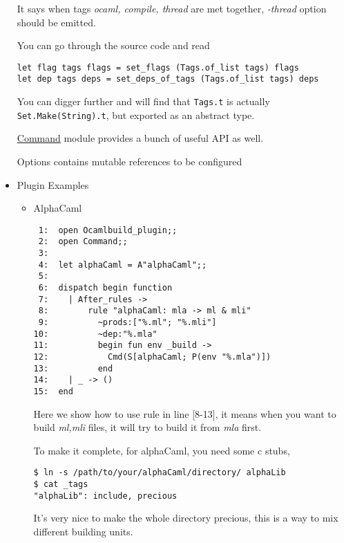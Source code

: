 \documentclass[11pt]{article}
\begin{document}
\begin{itemize}
     It says when tags \emph{ocaml, compile, thread} are met together,
     \emph{-thread} option should be emitted.

     You can go through the source code and read



\begin{verbatim}
let flag tags flags = set_flags (Tags.of_list tags) flags
let dep tags deps = set_deps_of_tags (Tags.of_list tags) deps
\end{verbatim}


     You can digger further and will find that \texttt{Tags.t} is actually
     \texttt{Set.Make(String).t}, but exported as an abstract type.

     \href{http://www.seas.upenn.edu/~hongboz/hongbo_zhang_files/ob/Command.html}{Command} module provides a bunch of useful API as well.

     Options contains mutable references to be configured

\item Plugin Examples
\label{sec-1-12-2-2}%
\begin{itemize}

\item AlphaCaml\\
\label{sec-1-12-2-2-1}%
\begin{verbatim}
 1:  open Ocamlbuild_plugin;;
 2:  open Command;;
 3:  
 4:  let alphaCaml = A"alphaCaml";;
 5:  
 6:  dispatch begin function
 7:    | After_rules ->
 8:        rule "alphaCaml: mla -> ml & mli"
 9:          ~prods:["%.ml"; "%.mli"]
10:          ~dep:"%.mla"
11:          begin fun env _build ->
12:            Cmd(S[alphaCaml; P(env "%.mla")])
13:          end
14:    | _ -> ()
15:  end
\end{verbatim}


      Here we show how to use rule in line [8-13], it means when
      you want to build \emph{ml,mli} files, it will try to build it from
      \emph{mla} first.

      To make it complete, for alphaCaml, you need some c stubs,


\begin{verbatim}
$ ln -s /path/to/your/alphaCaml/directory/ alphaLib
$ cat _tags
"alphaLib": include, precious
\end{verbatim}

      It's very nice to make the whole directory precious, this is a
      way to mix different building units.



\end{itemize}
\end{itemize}
\end{document}
